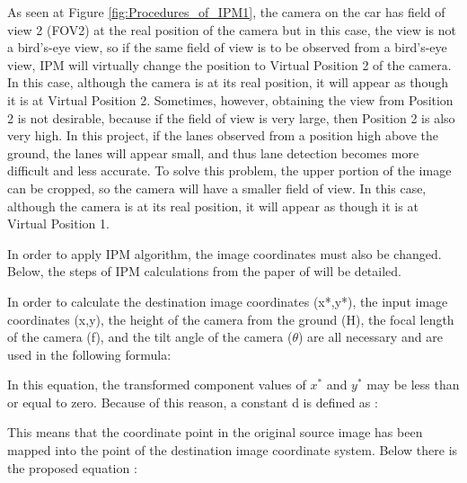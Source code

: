  As seen at Figure \ref{fig:Procedures_of_IPM1}, the camera on the car has field of view 2 (FOV2) at the real position of the camera but in this case, the view is not a bird's-eye view, so if the same field of view is to be observed from a bird's-eye view, IPM will virtually change the position to Virtual Position 2 of the camera. In this case, although the camera is at its real position, it will appear as though it is at Virtual Position 2. Sometimes, however, obtaining the view from Position 2 is not desirable, because if the field of view is very large, then Position 2 is also very high. In this project, if the lanes observed from a position high above the ground, the lanes will appear small, and thus lane detection becomes more difficult and less accurate. To solve this problem, the upper portion of the image can be cropped, so the camera will have a smaller field of view. In this case, although the camera is at its real position, it will appear as though it is at Virtual Position 1.
  
In order to apply IPM algorithm, the image coordinates must also be changed. Below, the steps of IPM calculations from the paper of \cite{IPM} will be detailed.


In order to calculate the destination image coordinates (x*,y*), the input image coordinates (x,y), the height of the camera from the ground (H), the focal length of the camera (f), and the tilt angle of the camera ($\theta$) are all necessary and are used in the following formula\cite{IPM}:
 
\begin{center}
\end{center}

In this equation, the transformed component values of $x^*$ and $y^*$ may be less than or equal to zero. Because of 
this reason, a constant d is defined as\cite{IPM} :
 \begin{center}
\end{center}

This means that the coordinate point in the original source image has been mapped into the point of the destination image coordinate system. Below there is the proposed equation\cite{IPM} :
 
